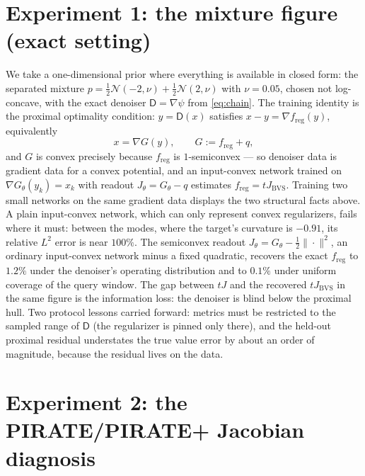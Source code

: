 \documentclass[11pt]{article}
\newcommand{\D}{\mathsf{D}}
\newcommand{\freg}{f_{\mathrm{reg}}}
\newcommand{\Jbvs}{J_{\mathrm{BVS}}}
\begin{document}
\section{Experiment 1: the mixture figure (exact setting)}

We take a one-dimensional prior where everything is available in closed form: the separated mixture $p = \tfrac12\mathcal N(-2, \nu) + \tfrac12\mathcal N(2, \nu)$ with $\nu = 0.05$, chosen not log-concave, with the exact denoiser $\D = \nabla\psi$ from \eqref{eq:chain}. The training identity is the proximal optimality condition: $y = \D(x)$ satisfies $x - y = \nabla\freg(y)$, equivalently
\[
x = \nabla G(y), \qquad G := \freg + q,
\]
and $G$ is convex precisely because $\freg$ is $1$-semiconvex --- so denoiser data is gradient data for a convex potential, and an input-convex network trained on $\nabla G_\theta(y_k) = x_k$ with readout $J_\theta = G_\theta - q$ estimates $\freg = t\Jbvs$. Training two small networks on the same gradient data displays the two structural facts above. A plain input-convex network, which can only represent convex regularizers, fails where it must: between the modes, where the target's curvature is $-0.91$, its relative $L^2$ error is near $100\%$. The semiconvex readout $J_\theta = G_\theta - \tfrac12\|\cdot\|^2$, an ordinary input-convex network minus a fixed quadratic, recovers the exact $\freg$ to $1.2\%$ under the denoiser's operating distribution and to $0.1\%$ under uniform coverage of the query window. The gap between $tJ$ and the recovered $t\Jbvs$ in the same figure is the information loss: the denoiser is blind below the proximal hull. Two protocol lessons carried forward: metrics must be restricted to the sampled range of $\D$ (the regularizer is pinned only there), and the held-out proximal residual understates the true value error by about an order of magnitude, because the residual lives on the data.

\section{Experiment 2: the PIRATE/PIRATE+ Jacobian diagnosis}
\label{sec:exp2}
\end{document}

